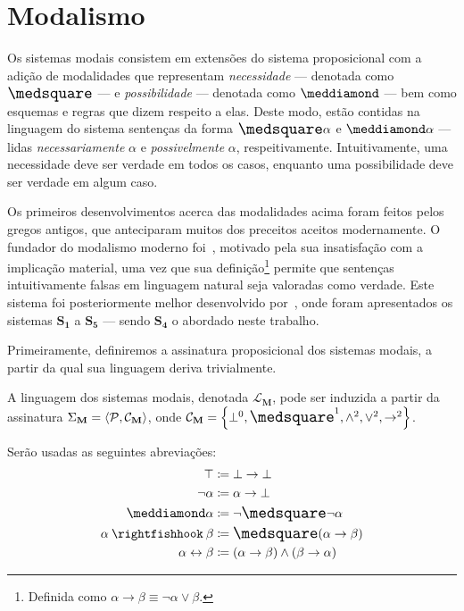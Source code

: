 \section{Modalismo}

    Os sistemas modais consistem em extensões do sistema proposicional com a adição de modalidades que representam \emph{necessidade} --- denotada como $\nec$ --- e \emph{possibilidade} --- denotada como $\pos$ --- bem como esquemas e regras que dizem respeito a elas. Deste modo, estão contidas na linguagem do sistema sentenças da forma $\nec\alpha$ e $\pos\alpha$ --- lidas \emph{necessariamente} $\alpha$ e \emph{possivelmente} $\alpha$, respeitivamente. Intuitivamente, uma necessidade deve ser verdade em todos os casos, enquanto uma possibilidade deve ser verdade em algum caso.

    Os primeiros desenvolvimentos acerca das modalidades acima foram feitos pelos gregos antigos, que anteciparam muitos dos preceitos aceitos modernamente. O fundador do modalismo moderno foi~\cite{Lewis}, motivado pela sua insatisfação com a implicação material, uma vez que sua definição\footnote{Definida como $\alpha\to\beta\equiv\neg\alpha\vee\beta$.} permite que sentenças intuitivamente falsas em linguagem natural seja valoradas como verdade. Este sistema foi posteriormente melhor desenvolvido por~\cite{Langford}, onde foram apresentados os sistemas $\mathbf{S_1}$ a $\mathbf{S_5}$ --- sendo $\mathbf{S_4}$ o abordado neste trabalho.

    Primeiramente, definiremos a assinatura proposicional dos sistemas modais, a partir da qual sua linguagem deriva trivialmente.

    \begin{definition}
        A linguagem dos sistemas modais, denotada $\mathcal{L}_\mathbf{M}$, pode ser induzida a partir da assinatura $\Sigma_\mathbf{M}=\langle\mathcal{P},\mathcal{C}_\mathbf{M}\rangle$, onde $\mathcal{C}_\mathbf{M}=\set{\bot^0,\nec^1,\wedge^2,\vee^2,\to^2}$.
    \end{definition}

    \begin{notation}
        Serão usadas as seguintes abreviações:
        \begin{align*}
            \top&\coloneqq\bot\to\bot\\
            \neg\alpha&\coloneqq\alpha\to\bot\\
            \pos\alpha&\coloneqq\neg\nec\neg\alpha\\
            \alpha\strictif\beta&\coloneqq\nec(\alpha\to\beta)\\
            \alpha\leftrightarrow\beta&\coloneqq(\alpha\to\beta)\wedge(\beta\to\alpha)
        \end{align*}
    \end{notation}

